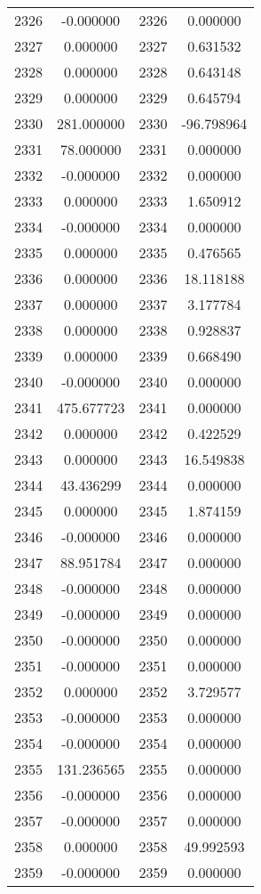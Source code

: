 \documentclass[12pt]{article}
\begin{document}
\begin{longtable}{@{}cccc@{}}
2326 & -0.000000 & 2326 & 0.000000 \\
2327 & 0.000000 & 2327 & 0.631532 \\
2328 & 0.000000 & 2328 & 0.643148 \\
2329 & 0.000000 & 2329 & 0.645794 \\
2330 & 281.000000 & 2330 & -96.798964 \\
2331 & 78.000000 & 2331 & 0.000000 \\
2332 & -0.000000 & 2332 & 0.000000 \\
2333 & 0.000000 & 2333 & 1.650912 \\
2334 & -0.000000 & 2334 & 0.000000 \\
2335 & 0.000000 & 2335 & 0.476565 \\
2336 & 0.000000 & 2336 & 18.118188 \\
2337 & 0.000000 & 2337 & 3.177784 \\
2338 & 0.000000 & 2338 & 0.928837 \\
2339 & 0.000000 & 2339 & 0.668490 \\
2340 & -0.000000 & 2340 & 0.000000 \\
2341 & 475.677723 & 2341 & 0.000000 \\
2342 & 0.000000 & 2342 & 0.422529 \\
2343 & 0.000000 & 2343 & 16.549838 \\
2344 & 43.436299 & 2344 & 0.000000 \\
2345 & 0.000000 & 2345 & 1.874159 \\
2346 & -0.000000 & 2346 & 0.000000 \\
2347 & 88.951784 & 2347 & 0.000000 \\
2348 & -0.000000 & 2348 & 0.000000 \\
2349 & -0.000000 & 2349 & 0.000000 \\
2350 & -0.000000 & 2350 & 0.000000 \\
2351 & -0.000000 & 2351 & 0.000000 \\
2352 & 0.000000 & 2352 & 3.729577 \\
2353 & -0.000000 & 2353 & 0.000000 \\
2354 & -0.000000 & 2354 & 0.000000 \\
2355 & 131.236565 & 2355 & 0.000000 \\
2356 & -0.000000 & 2356 & 0.000000 \\
2357 & -0.000000 & 2357 & 0.000000 \\
2358 & 0.000000 & 2358 & 49.992593 \\
2359 & -0.000000 & 2359 & 0.000000 \\

\end{longtable}
\end{document}
